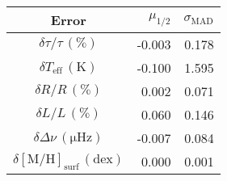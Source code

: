 \begin{tabular}{crr}
\toprule
                                                 \textbf{Error} &  $\mu_{1/2}$ &  $\sigma_\mathrm{MAD}$ \\
\midrule
                                       $\delta \tau/\tau\,(\%)$ &       -0.003 &                  0.178 \\
                          $\delta T_\mathrm{eff}\,(\mathrm{K})$ &       -0.100 &                  1.595 \\
                                             $\delta R/R\,(\%)$ &        0.002 &                  0.071 \\
                                             $\delta L/L\,(\%)$ &        0.060 &                  0.146 \\
                          $\delta \Delta\nu\,(\si{\micro\hertz})$ &       -0.007 &                  0.084 \\
 $\delta [\mathrm{M}/\mathrm{H}]_\mathrm{surf}\,(\mathrm{dex})$ &        0.000 &                  0.001 \\
\bottomrule
\end{tabular}
